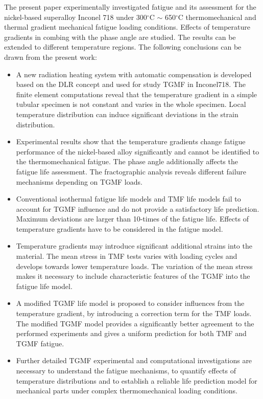 \documentclass[preprint,5p,twocolumn,10pt,sort&compress]{elsarticle}
\begin{document}
The present paper experimentally investigated fatigue and its assessment for the nickel-based superalloy Inconel 718 under 300$^\circ$C $\sim$ 650$^\circ$C thermomechanical and thermal gradient mechanical fatigue loading conditions. Effects of temperature gradients in combing with the phase angle are studied. The results can be extended to different temperature regions. The following conclusions can be drawn from the present work:
\begin{itemize}
\item A new radiation heating system with automatic compensation is developed based on the DLR concept and used for study TGMF in Inconel718. The finite element computations reveal that the temperature gradient in a simple tubular specimen is not constant and varies in the whole specimen.  Local temperature distribution can induce significant deviations in the strain distribution.

\item Experimental results show that the temperature gradients change {fatigue performance} of the nickel-based alloy significantly and cannot be identified to the thermomechanical fatigue. The phase angle additionally affects the fatigue life assessment. The fractographic analysis reveals different failure mechanisms depending on TGMF loads.

\item Conventional isothermal fatigue life models and TMF life models fail to account for TGMF influence and do not provide a satisfactory life prediction.  Maximum deviations are larger than 10-times of the fatigue life. Effects of temperature gradients have to be considered in the fatigue model.

\item Temperature gradients may introduce significant additional strains into the material. The mean stress in TMF tests varies with loading cycles and develops towards lower temperature loads. The variation of the mean stress makes it necessary to include characteristic features of the TGMF into the fatigue life model.

\item A modified TGMF life model is proposed to consider influences from the temperature gradient, by introducing a correction term for the TMF loads. The modified TGMF model provides a significantly better agreement to the performed experiments and gives a uniform prediction for both TMF and TGMF fatigue.

\item Further detailed TGMF experimental and computational investigations are necessary to understand the fatigue mechanisms, to quantify effects of temperature distributions and to establish a reliable life prediction model for mechanical parts under complex thermomechanical loading conditions.

\end{itemize}
\end{document}

